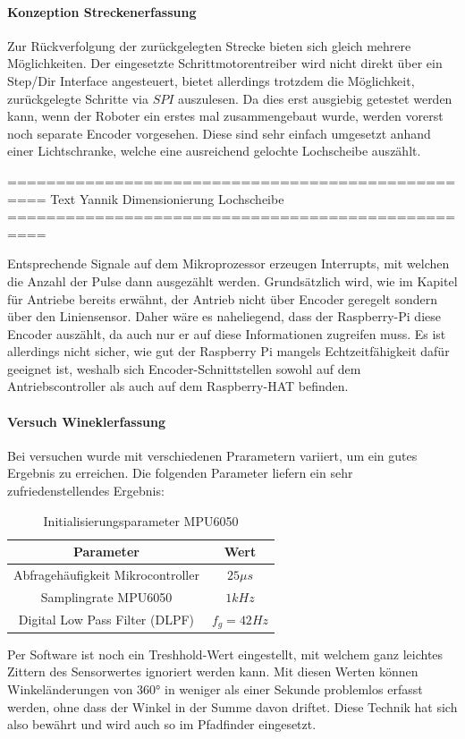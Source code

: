 \documentclass[main.tex]{subfiles} %
\begin{document}
\paragraph{Konzeption Streckenerfassung}
Zur Rückverfolgung der zurückgelegten Strecke bieten sich gleich mehrere
Möglichkeiten. Der eingesetzte Schrittmotorentreiber wird nicht direkt über ein
Step/Dir Interface angesteuert, bietet allerdings trotzdem die Möglichkeit,
zurückgelegte Schritte via $SPI$ auszulesen. Da dies erst ausgiebig getestet
werden kann, wenn der Roboter ein erstes mal zusammengebaut wurde, werden
vorerst noch separate Encoder vorgesehen. Diese sind sehr einfach umgesetzt
anhand einer Lichtschranke, welche eine ausreichend gelochte Lochscheibe
auszählt.

==================================================
Text Yannik Dimensionierung Lochscheibe
==================================================

Entsprechende Signale auf dem Mikroprozessor erzeugen Interrupts, mit welchen
die Anzahl der Pulse dann ausgezählt werden. Grundsätzlich wird, wie im Kapitel
für Antriebe bereits erwähnt, der Antrieb nicht über Encoder geregelt sondern
über den Liniensensor. Daher wäre es naheliegend, dass der Raspberry-Pi diese
Encoder auszählt, da auch nur er auf diese Informationen zugreifen muss. Es ist
allerdings nicht sicher, wie gut der Raspberry Pi mangels Echtzeitfähigkeit
dafür geeignet ist, weshalb sich Encoder-Schnittstellen sowohl auf dem
Antriebscontroller als auch auf dem Raspberry-HAT befinden.

\paragraph{Versuch Wineklerfassung}
Bei versuchen wurde mit verschiedenen Prarametern variiert, um ein gutes
Ergebnis zu erreichen. Die folgenden Parameter liefern ein sehr
zufriedenstellendes Ergebnis:

\begin{table}[h]                                    %
    \centering
    \begin{tabular}{|c|c|}                        %
        \hline
        Parameter                         & Wert         \\ \hline
        Abfragehäufigkeit Mikrocontroller & $25 \mu s$   \\ \hline
        Samplingrate MPU6050              & $1 kHz$      \\ \hline
        Digital Low Pass Filter (DLPF)    & $f_g = 42Hz$ \\ \hline
    \end{tabular}
    \caption{Initialisierungsparameter MPU6050}
    \label{tab:params_mpu6050}
\end{table}

Per Software ist noch ein Treshhold-Wert eingestellt, mit welchem ganz leichtes
Zittern des Sensorwertes ignoriert werden kann. Mit diesen Werten können
Winkeländerungen von 360° in weniger als einer Sekunde problemlos erfasst
werden, ohne dass der Winkel in der Summe davon driftet. Diese Technik hat sich
also bewährt und wird auch so im Pfadfinder eingesetzt.
\end{document}
